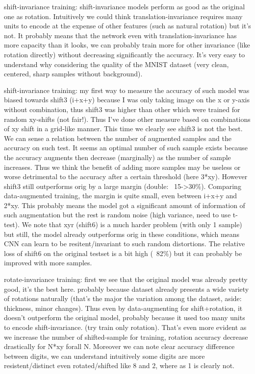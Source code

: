 \documentclass[a4paper,12pt]{article}
\begin{document}
shift-invariance training: shift-invariance models perform as good as the original one as rotation. Intuitively we could think translation-invariance requires many units to encode at the expense of other features (such as natural rotation) but it's not. It probably means that the network even with translation-invariance has more capacity than it looks, we can probably train more for other invariance (like rotation directly) without decreasing significantly the accuracy. It's very easy to understand why considering the quality of the MNIST dataset (very clean, centered, sharp samples without background).

shift-invariance training: my first way to measure the accuracy of such model was biased towards shift3 (i+x+y) because I was only taking image on the x or y-axis without combination, thus shift3 was higher than other which were trained for random xy-shifts (not fair!). Thus I've done other measure based on combinations of xy shift in a grid-like manner. This time we clearly see shift3 is not the best. We can sense a relation between the number of augmented samples and the accuracy on such test. It seems an optimal number of such sample exists because the accuracy augments then decrease (marginally) as the number of sample increases. Thus we think the benefit of adding more samples may be useless or worse detrimental to the accuracy after a certain threshold (here 3*xy). However shift3 still outperforms orig by a large margin (double: ~15->30\%). Comparing data-augmented training, the margin is quite small, even between i+x+y and 2*xy. This probably means the model got a significant amount of information of such augmentation but the rest is random noise (high variance, need to use t-test).
We note that xyr (shift6) is a much harder problem (with only 1 sample) but still, the model already outperforms orig in these conditions, which means CNN can learn to be resitent/invariant to such random distortions. The relative loss of shift6 on the original testset is a bit high (~82\%) but it can probably be improved with more samples.

rotate-invariance training: first we see that the original model was already pretty good, it's the best here. probably because dataset already presents a wide variety of rotations naturally (that's the major the variation among the dataset, aside: thickness, minor changes). Thus even by data-augmenting for shift+rotation, it doesn't outperform the original model, probably because it used too many units to encode shift-invariance. (try train only rotation). That's even more evident as we increase the number of shifted-sample for training, rotation accuracy decrease drastically for N*xy forall N. Moreover we can note clear accuracy difference between digits, we can understand intuitively some digits are more resistent/distinct even rotated/shifted like 8 and 2, where as 1 is clearly not.
\end{document}
